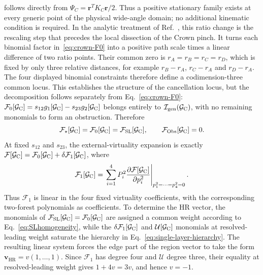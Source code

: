 \documentclass[a4paper,11pt]{article}
\newcommand{\HR}{\mathrm{HR}}
\newcommand{\FSL}{\mathcal F_{\rm SL}}
\newcommand{\FObs}{\mathcal F_{\rm Obs}}
\begin{document}
follows directly from
\(\Psi_C=\boldsymbol r^TK_C\boldsymbol r/2\).  Thus a positive stationary
family exists at every generic point of the physical wide-angle domain; no
additional kinematic condition is required.  In the analytic treatment of
Ref.~\cite{Gardi:2024axt}, this ratio change is the rescaling step that
precedes the local dissection of the Crown pinch.  It turns
each binomial factor in~\eqref{eq:crown-F0} into a positive path scale times
a linear difference of two ratio points.  Their common zero is
\(r_A=r_B=r_C=r_D\), which is fixed by only three relative distances, for
example \(r_B-r_A\), \(r_C-r_A\) and \(r_D-r_A\).  The four displayed
binomial constraints therefore define a codimension-three common locus.
This establishes the structure of the cancellation locus, but the
decomposition follows separately from Eq.~\eqref{eq:crown-F0}:
\(\mathcal F_0[\mathcal G_{\rm C}]
=s_{12}g_1[\mathcal G_{\rm C}]-s_{23}g_2[\mathcal G_{\rm C}]\) belongs entirely to
\(\mathcal I_{\rm gen}(\mathcal G_{\rm C})\), with no remaining monomials to
form an obstruction.  Therefore
\begin{equation}
 \mathcal F_\star[\mathcal G_{\rm C}]
 =\mathcal F_0[\mathcal G_{\rm C}]
 =\FSL[\mathcal G_{\rm C}],
 \qquad \FObs[\mathcal G_{\rm C}]=0.
 \label{eq:crown-no-obstruction}
\end{equation}
At fixed \(s_{12}\) and \(s_{23}\), the external-virtuality expansion is
exactly
\(\mathcal F[\mathcal G_{\rm C}]
=\mathcal F_0[\mathcal G_{\rm C}]
+\delta\mathcal F_1[\mathcal G_{\rm C}]\), where
\begin{equation*}
 \mathcal F_1[\mathcal G_{\rm C}]
 =\left.\sum_{i=1}^4 P_i^2
   \frac{\partial\mathcal F[\mathcal G_{\rm C}]}{\partial p_i^2}
  \right|_{p_1^2=\cdots=p_4^2=0}.
\end{equation*}
Thus \(\mathcal F_1\) is linear in the four fixed virtuality coefficients,
with the corresponding two-forest polynomials as coefficients.  To determine
the HR vector, the monomials of
\(\FSL[\mathcal G_{\rm C}]=\mathcal F_0[\mathcal G_{\rm C}]\) are assigned a
common weight according to Eq.~\eqref{eq:SLhomogeneity}, while the
\(\delta\mathcal F_1[\mathcal G_{\rm C}]\) and
\(\mathcal U[\mathcal G_{\rm C}]\) monomials at resolved-leading weight
saturate the hierarchy in Eq.~\eqref{eq:single-layer-hierarchy}.  The resulting
linear system forces the edge part of the region vector to take the form
\(\boldsymbol v_{\HR}=v(1,\ldots,1)\).  Since
\(\mathcal F_1\) has degree four and \(\mathcal U\) degree three, their
equality at resolved-leading weight gives \(1+4v=3v\), and hence \(v=-1\).
\end{document}
